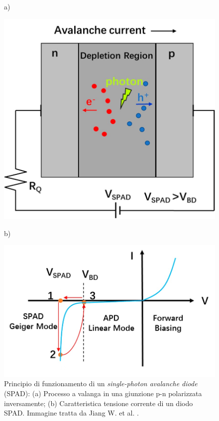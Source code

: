 \begin{figure}[tbh]
	\centering
	a)
	\begin{minipage}{.45\textwidth}
		\includegraphics[width=0.8\linewidth]{./ImageFiles/spad_scheme.png}
	\end{minipage}
	b)
	\begin{minipage}{.45\textwidth}
		\includegraphics[width=\linewidth]{./ImageFiles/spad_VI.png}
	\end{minipage}
	\caption{Principio di funzionamento di un \textit{single-photon avalanche diode} (SPAD): (a) Processo a valanga in una giunzione p-n polarizzata inversamente; (b) Caratteristica tensione corrente di un diodo SPAD. Immagine tratta da Jiang W. et al. \cite{Jiang2019}.} 
	\label{fig:spad_VI}
\end{figure}

